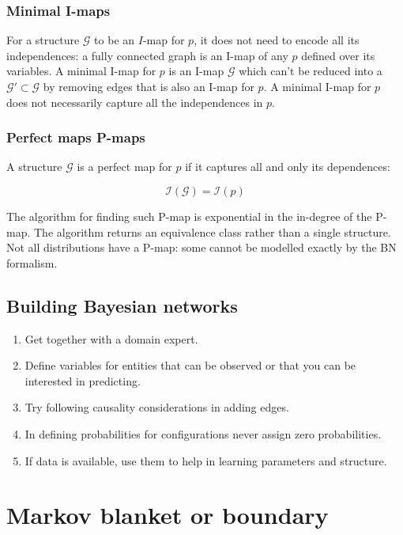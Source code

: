 		\subsubsection{Minimal I-maps}
		For a structure $\mathcal{G}$ to be an $I$-map for $p$, it does not need to encode all its independences: a fully connected graph is an I-map of any $p$ defined over its variables.
		A minimal I-map for $p$ is an I-map $\mathcal{G}$ which can't be reduced into a $\mathcal{G}'\subset\mathcal{G}$ by removing edges that is also an I-map for $p$.
		A minimal I-map for $p$ does not necessarily capture all the independences in $p$.

		\subsubsection{Perfect maps P-maps}
		A structure $\mathcal{G}$ is a perfect map for $p$ if it captures all and only its dependences:

		$$\mathcal{I}(\mathcal{G}) = \mathcal{I}(p)$$

		The algorithm for finding such P-map is exponential in the in-degree of the P-map.
		The algorithm returns an equivalence class rather than a single structure.
		Not all distributions have a P-map: some cannot be modelled exactly by the BN formalism.

	\subsection{Building Bayesian networks}
	\begin{multicols}{2}
		\begin{enumerate}
			\item Get together with a domain expert.
			\item Define variables for entities that can be observed or that you can be interested in predicting.
			\item Try following causality considerations in adding edges.
			\item In defining probabilities for configurations never assign zero probabilities.
			\item If data is available, use them to help in learning parameters and structure.
		\end{enumerate}
	\end{multicols}

\section{Markov blanket or boundary}

